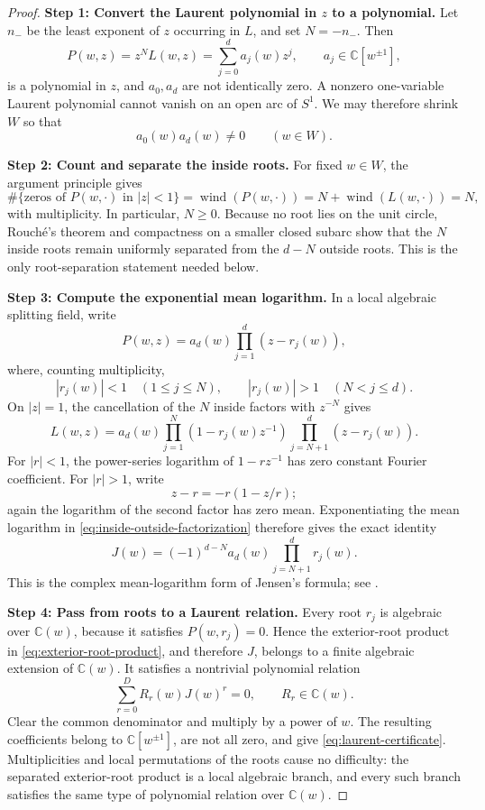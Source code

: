 \documentclass[reqno]{amsart}
\theoremstyle{remark}
\numberwithin{equation}{section}
\newcommand{\C}{\mathbb{C}}
\newcommand{\wind}{\operatorname{wind}}
\begin{document}
\begin{proof}
\textbf{Step 1: Convert the Laurent polynomial in \(z\) to a polynomial.}
Let \(n_-\) be the least exponent of \(z\) occurring in \(L\), and set
\(N=-n_-\). Then
\[
  P(w,z)=z^NL(w,z)=\sum_{j=0}^{d}a_j(w)z^j,
  \qquad a_j\in\C[w^{\pm1}],
\]
is a polynomial in \(z\), and \(a_0,a_d\) are not identically zero. A
nonzero one-variable Laurent polynomial cannot vanish on an open arc of
\(S^1\). We may therefore shrink \(W\) so that
\[
  a_0(w)a_d(w)\neq0
  \qquad(w\in W).
\]

\smallskip
\noindent
\textbf{Step 2: Count and separate the inside roots.}
For fixed \(w\in W\), the argument principle gives
\[
  \#\{\text{zeros of }P(w,\cdot)\text{ in }|z|<1\}
  =\wind(P(w,\cdot))
  =N+\wind(L(w,\cdot))=N,
\]
with multiplicity. In particular, \(N\geq0\). Because no root lies on the
unit circle, Rouch\'e's theorem and compactness on a smaller closed subarc show
that the \(N\) inside roots remain uniformly separated from the \(d-N\)
outside roots. This is the only root-separation statement needed below.

\smallskip
\noindent
\textbf{Step 3: Compute the exponential mean logarithm.}
In a local algebraic splitting field, write
\[
  P(w,z)=a_d(w)\prod_{j=1}^{d}(z-r_j(w)),
\]
where, counting multiplicity,
\[
  |r_j(w)|<1\quad(1\leq j\leq N),
  \qquad
  |r_j(w)|>1\quad(N<j\leq d).
\]
On \(|z|=1\), the cancellation of the \(N\) inside factors with \(z^{-N}\)
gives
\begin{equation}
  L(w,z)
  =a_d(w)
   \prod_{j=1}^{N}(1-r_j(w)z^{-1})
   \prod_{j=N+1}^{d}(z-r_j(w)).
  \label{eq:inside-outside-factorization}
\end{equation}
For \(|r|<1\), the power-series logarithm of \(1-rz^{-1}\) has zero constant
Fourier coefficient. For \(|r|>1\), write
\[
  z-r=-r(1-z/r);
\]
again the logarithm of the second factor has zero mean. Exponentiating the
mean logarithm in \eqref{eq:inside-outside-factorization} therefore gives the
exact identity
\begin{equation}
  J(w)
  =(-1)^{d-N}a_d(w)
   \prod_{j=N+1}^{d}r_j(w).
  \label{eq:exterior-root-product}
\end{equation}
This is the complex mean-logarithm form of Jensen's formula; see
\cite{Ahlfors,Conway}.

\smallskip
\noindent
\textbf{Step 4: Pass from roots to a Laurent relation.}
Every root \(r_j\) is algebraic over \(\C(w)\), because it satisfies
\(P(w,r_j)=0\). Hence the exterior-root product in
\eqref{eq:exterior-root-product}, and therefore \(J\), belongs to a finite
algebraic extension of \(\C(w)\). It satisfies a nontrivial polynomial
relation
\[
  \sum_{r=0}^{D}R_r(w)J(w)^r=0,
  \qquad R_r\in\C(w).
\]
Clear the common denominator and multiply by a power of \(w\). The resulting
coefficients belong to \(\C[w^{\pm1}]\), are not all zero, and give
\eqref{eq:laurent-certificate}. Multiplicities and local permutations of the
roots cause no difficulty: the separated exterior-root product is a local
algebraic branch, and every such branch satisfies the same type of polynomial
relation over \(\C(w)\).
\end{proof}
\end{document}
